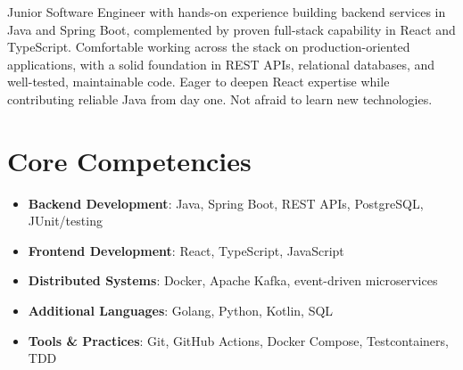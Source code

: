 \documentclass[11pt,a4paper,sans]{moderncv}
\begin{document}
\makecvtitle


\vspace{6pt}
\small{Junior Software Engineer with hands-on experience building backend services in Java and Spring Boot, complemented by proven full-stack capability in React and TypeScript. Comfortable working across the stack on production-oriented applications, with a solid foundation in REST APIs, relational databases, and well-tested, maintainable code. Eager to deepen React expertise while contributing reliable Java from day one. Not afraid to learn new technologies.}


\section{Core Competencies}
\vspace{1pt}
\begin{itemize}

\item \textbf{Backend Development}: Java, Spring Boot, REST APIs, PostgreSQL, JUnit/testing

\item \textbf{Frontend Development}: React, TypeScript, JavaScript

\item \textbf{Distributed Systems}: Docker, Apache Kafka, event-driven microservices

\item \textbf{Additional Languages}: Golang, Python, Kotlin, SQL

\item \textbf{Tools \& Practices}: Git, GitHub Actions, Docker Compose, Testcontainers, TDD

\end{itemize}

\end{document}
